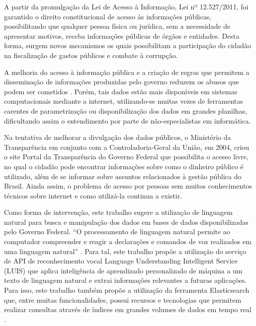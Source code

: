 A partir da promulgação da Lei de Acesso à Informação, Lei nº 12.527/2011, foi garantido o direito constitucional de acesso às informações públicas, possibilitando que qualquer pessoa física ou jurídica, sem a necessidade de apresentar motivos, receba informações públicas de órgãos e entidades. Desta forma, surgem novos mecanismos os quais possibilitam a participação do cidadão na fiscalização de gastos públicos e combate à corrupção.

		A melhoria do acesso à informação pública e a criação de regras que permitem a disseminação de informações produzidas pelo governo reduzem os abusos que podem ser cometidos \cite{Islam:2002}. Porém, tais dados estão mais disponíveis em sistemas computacionais mediante a internet, utilizando-se muitas vezes de ferramentas carentes de parametrização ou disponibilização dos dados em grandes planilhas, dificultando assim o entendimento por parte de não-especialistas em informática.

		Na tentativa de melhorar a divulgação dos dados públicos, o Ministério da Transparência em conjunto com a Controladoria-Geral da União, em 2004, criou o site Portal da Transparência do Governo Federal que possibilita o acesso livre, no qual o cidadão pode encontrar informações sobre como o dinheiro público é utilizado, além de se informar sobre assuntos relacionados à gestão pública do Brasil.  Ainda assim, o problema de acesso por pessoas sem muitos conhecimentos técnicos sobre internet e como utilizá-la continua a existir.

		Como forma de intervenção, este trabalho sugere a utilização de linguagem natural para busca e manipulação dos dados em bases de dados disponibilizadas pelo Governo Federal. “O processamento de linguagem natural permite ao computador compreender e reagir a declarações e comandos de voz realizados em uma linguagem natural” \cite[p. 508]{Stair:2015}. Para tal, este trabalho propõe a utilização do serviço de API de reconhecimento vocal Language Understanding Intelligent Service (LUIS) que aplica inteligência de aprendizado personalizado de máquina a um texto de linguagem natural e extrai informações relevantes a futuras aplicações.  Para isso, este trabalho também propõe a utilização da ferramenta Elasticsearch que, entre muitas funcionalidades, possui recursos e tecnologias que permitem realizar consultas através de índices em grandes volumes de dados em tempo real \cite{Gil:2010}.
